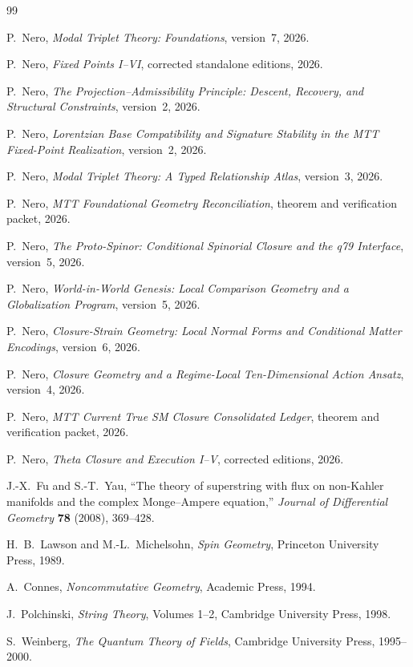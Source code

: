 \documentclass[11pt,openany]{book}
\begin{document}
\begin{thebibliography}{99}

P.~Nero, \emph{Modal Triplet Theory: Foundations}, version~7, 2026.

P.~Nero, \emph{Fixed Points I--VI}, corrected standalone editions, 2026.

P.~Nero, \emph{The Projection--Admissibility Principle: Descent, Recovery,
and Structural Constraints}, version~2, 2026.

P.~Nero, \emph{Lorentzian Base Compatibility and Signature Stability in the
MTT Fixed-Point Realization}, version~2, 2026.

P.~Nero, \emph{Modal Triplet Theory: A Typed Relationship Atlas}, version~3,
2026.

P.~Nero, \emph{MTT Foundational Geometry Reconciliation}, theorem and
verification packet, 2026.

P.~Nero, \emph{The Proto-Spinor: Conditional Spinorial Closure and the q79
Interface}, version~5, 2026.

P.~Nero, \emph{World-in-World Genesis: Local Comparison Geometry and a
Globalization Program}, version~5, 2026.

P.~Nero, \emph{Closure-Strain Geometry: Local Normal Forms and Conditional
Matter Encodings}, version~6, 2026.

P.~Nero, \emph{Closure Geometry and a Regime-Local Ten-Dimensional Action
Ansatz}, version~4, 2026.

P.~Nero, \emph{MTT Current True SM Closure Consolidated Ledger}, theorem and
verification packet, 2026.

P.~Nero, \emph{Theta Closure and Execution I--V}, corrected editions, 2026.

J.-X.~Fu and S.-T.~Yau, ``The theory of superstring with flux on non-Kahler
manifolds and the complex Monge--Ampere equation,''
\emph{Journal of Differential Geometry} \textbf{78} (2008), 369--428.

H.~B.~Lawson and M.-L.~Michelsohn, \emph{Spin Geometry}, Princeton University
Press, 1989.

A.~Connes, \emph{Noncommutative Geometry}, Academic Press, 1994.

J.~Polchinski, \emph{String Theory}, Volumes 1--2, Cambridge University Press,
1998.

S.~Weinberg, \emph{The Quantum Theory of Fields}, Cambridge University Press,
1995--2000.

\end{thebibliography}
\end{document}
